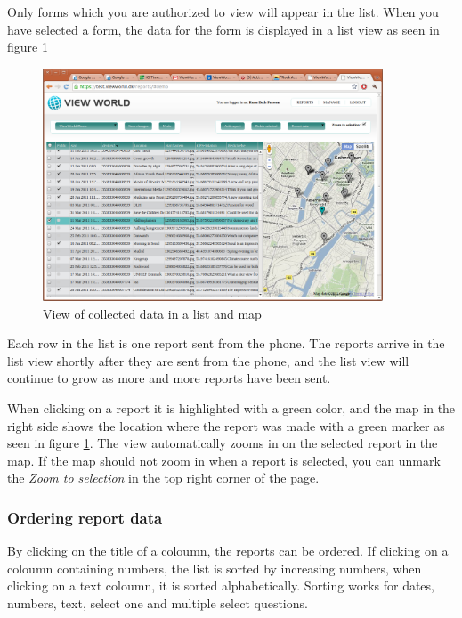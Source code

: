 \documentclass[a4paper, 12pt, final]{article}
\begin{document}
Only forms which you are authorized to view will appear in the list. When you have selected a form, the data for the form is displayed in a list view as seen in figure \ref{fig:web_view_demo_data}

\begin{figure}[H]
  \centering
      \includegraphics[width=0.9\textwidth]{pics/web_view_demo_data.png}
  \caption{View of collected data in a list and map}
  \label{fig:web_view_demo_data}
\end{figure}

Each row in the list is one report sent from the phone. The reports arrive in the list view shortly after they are sent from the phone, and the list view will continue to grow as more and more reports have been sent. 

When clicking on a report it is highlighted with a green color, and the map in the right side shows the location where the report was made with a green marker as seen in figure \ref{fig:web_view_demo_data}. The view automatically zooms in on the selected report in the map. If the map should not zoom in when a report is selected, you can unmark the \emph{Zoom to selection} in the top right corner of the page.

\subsubsection{Ordering report data}

By clicking on the title of a coloumn, the reports can be ordered. If clicking on a coloumn containing numbers, the list is sorted by increasing numbers, when clicking on a text coloumn, it is sorted alphabetically. Sorting works for dates, numbers, text, select one and multiple select questions.
\end{document}
